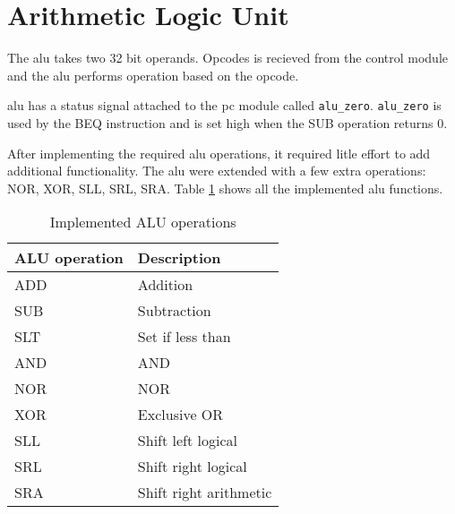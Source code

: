 \section{Arithmetic Logic Unit}
The \gls{alu} takes two 32 bit operands.
Opcodes is recieved from the control module and the \gls{alu} performs operation based on the opcode.

\gls{alu} has a status signal attached to the \gls{pc} module called \texttt{alu\_zero}.
\texttt{alu\_zero} is used by the BEQ instruction and is set high when the SUB operation returns 0.

After implementing the required \gls{alu} operations, it required litle effort to add additional functionality.
The \gls{alu} were extended with a few extra operations: NOR, XOR, SLL, SRL, SRA.
Table \ref{table:instructions} shows all the implemented \gls{alu} functions.

\begin{table}
\centering
\begin{tabular}{ |l|l| }
  \hline
  ALU operation & Description             \\ \hline
  ADD           & Addition                \\
  SUB           & Subtraction             \\
  SLT           & Set if less than        \\
  AND           & AND                     \\
  NOR           & NOR                     \\
  XOR           & Exclusive OR            \\
  SLL           & Shift left logical      \\
  SRL           & Shift right logical     \\
  SRA           & Shift right arithmetic  \\
  \hline
\end{tabular}
\caption{Implemented ALU operations}
\label{table:instructions}
\end{table}
